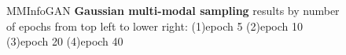 \documentclass[letterpaper,12pt]{article}
\begin{document}
\begin{figure}[H]
    \hspace{10px}
    \caption{MMInfoGAN \textbf{Gaussian multi-modal sampling } results by number of epochs from top left to lower right: (1)epoch 5 (2)epoch 10 (3)epoch 20 (4)epoch 40}
\end{figure}


\begin{figure}[H]  
    \hspace{10px}
    \hspace{10px}

\end{figure}
\end{document}
